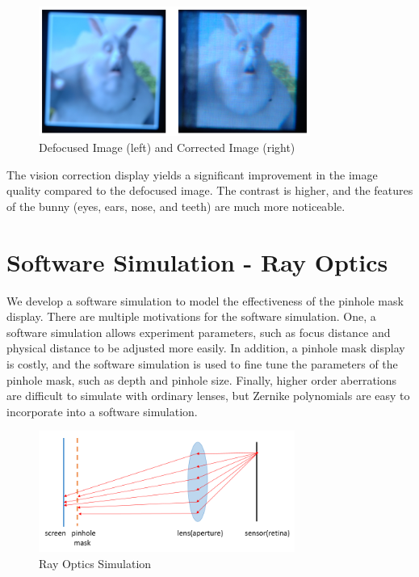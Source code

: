 \documentclass{acmsiggraph}
\begin{document}
\begin{figure}[ht]
  \centering
  \includegraphics[width=3.5in]{Defocused_Corrected_Image.png}
  \caption{Defocused Image (left) and Corrected Image (right)}
  \label{fig:ferrari}
\end{figure}

The vision correction display yields a significant improvement in the image quality compared to the defocused image. The contrast is higher, and the features of the bunny (eyes, ears, nose, and teeth) are much more noticeable. 

\section{Software Simulation - Ray Optics}

We develop a software simulation to model the effectiveness of the pinhole mask display. There are multiple motivations for the software simulation. One, a software simulation allows experiment parameters, such as focus distance and physical distance to be adjusted more easily. In addition, a pinhole mask display is costly, and the software simulation is used to fine tune the parameters of the pinhole mask, such as depth and pinhole size. Finally, higher order aberrations are difficult to simulate with ordinary lenses, but Zernike polynomials are easy to incorporate into a software simulation.

\begin{figure}[ht]
  \centering
  \includegraphics[width=3.3in]{Ray_Simulation.png}
  \caption{Ray Optics Simulation}
  \label{fig:ray_optics}
\end{figure}
\end{document}
